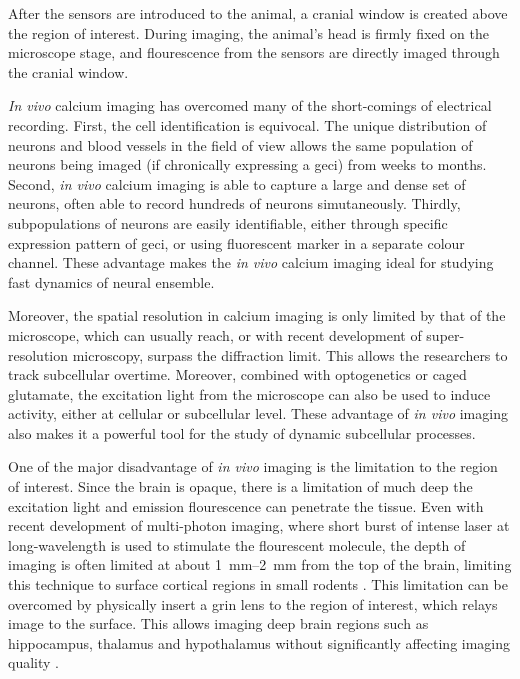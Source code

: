 After the sensors are introduced to the animal, a cranial window is created above the region of interest. During imaging, the animal's head is firmly fixed on the microscope stage, and flourescence from the sensors are directly imaged through the cranial window. 

\textit{In vivo} calcium imaging has overcomed many of the short-comings of electrical recording. First, the cell identification is equivocal. The unique distribution of neurons and blood vessels in the field of view allows the same population of neurons being imaged (if chronically expressing a \gls{geci}) from weeks to months. Second, \textit{in vivo} calcium imaging is able to capture a large and dense set of neurons, often able to record hundreds of neurons simutaneously. Thirdly, subpopulations of neurons are easily identifiable, either through specific expression pattern of \gls{geci}, or using fluorescent marker in a separate colour channel. These advantage makes the \textit{in vivo} calcium imaging ideal for studying fast dynamics of neural ensemble. 

Moreover, the spatial resolution in calcium imaging is only limited by that of the microscope, which can usually reach, or with recent development of super-resolution microscopy, surpass the diffraction limit. This allows the researchers to track subcellular  overtime. Moreover, combined with optogenetics or caged glutamate, the excitation light from the microscope can also be used to induce activity, either at cellular or subcellular level. These advantage of \textit{in vivo} imaging also makes it a powerful tool for the study of dynamic subcellular processes. 

One of the major disadvantage of \textit{in vivo} imaging is the limitation to the region of interest. Since the brain is opaque, there is a limitation of much deep the excitation light and emission flourescence can penetrate the tissue. Even with recent development of multi-photon imaging, where short burst of intense laser at long-wavelength is used to stimulate the flourescent molecule, the depth of imaging is often limited at about \SIrange{1}{2}{\mm} from the top of the brain, limiting this technique to surface cortical regions in small rodents \citep{horton13}. This limitation can be overcomed by physically insert a \gls{grin} lens to the region of interest, which relays image to the surface. This allows imaging deep brain regions such as hippocampus, thalamus and hypothalamus without significantly affecting imaging quality \citep{attardo15}.

